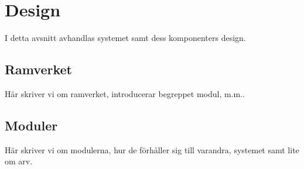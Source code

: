 \section{Design}
I detta avsnitt avhandlas systemet samt dess komponenters design.

\subsection{Ramverket}
Här skriver vi om ramverket, introducerar begreppet modul, m.m..

\subsection{Moduler}
Här skriver vi om modulerna, hur de förhåller sig till varandra, systemet samt
lite om arv.
